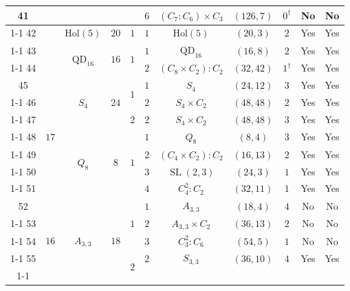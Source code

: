 \documentclass[12pt]{amsart}
\numberwithin{equation}{section}
\theoremstyle{plain}
\theoremstyle{definition}
\theoremstyle{remark}
\DeclareMathOperator{\SL}{SL}
\begin{document}
{\begin{longtable}{|c|c|c|c|c|c|c|c|c|c|c|}
41 &  &  &  &  & $6$ & \multicolumn{1}{c|}{$(C_7:C_6)\times C_3$} & $(126,7)$ & $0^\dagger$ & No & No \\ \cline{1-1} \cline{3-11}
42 &  & $\mathrm{Hol}(5)$ & $20$ & $1$ & $1$ & \multicolumn{1}{c|}{$\mathrm{Hol}(5)$} & $(20,3)$ & $2$ & Yes & Yes \\ \cline{1-1} \cline{3-11}
43 &  & \multirow[t]{2}{*}{$\mathrm{QD}_{16}$} & \multirow[t]{2}{*}{$16$} & \multirow[t]{2}{*}{$1$} & $1$ & \multicolumn{1}{c|}{$\mathrm{QD}_{16}$} & $(16,8)$ & $2$ & Yes & Yes \\ \cline{1-1} \cline{6-11}
44 &  &  &  &  & $2$ & \multicolumn{1}{c|}{$(C_8\times C_2): C_2$} & $(32,42)$ & $1^\dagger$ & Yes & Yes \\ \hline
45 & \multirow[t]{7}{*}{$17$} & \multirow[t]{3}{*}{$S_4$} & \multirow[t]{3}{*}{$24$} & \multirow[t]{2}{*}{$1$} & $1$ & \multicolumn{1}{c|}{$S_4$} & $(24,12)$ & $3$ & Yes & Yes \\ \cline{1-1} \cline{6-11}
46 &  &  &  &  & $2$ & \multicolumn{1}{c|}{$S_4\times C_2$} & $(48,48)$ & $2$ & Yes & Yes \\ \cline{1-1} \cline{5-11}
47 &  &  &  & $2$ & $2$ & \multicolumn{1}{c|}{$S_4\times C_2$} & $(48,48)$ & $3$ & Yes & Yes \\ \cline{1-1} \cline{3-11}
48 &  & \multirow[t]{4}{*}{$Q_8$} & \multirow[t]{4}{*}{$8$} & \multirow[t]{4}{*}{$1$} & $1$ & \multicolumn{1}{c|}{$Q_8$} & $(8,4)$ & $3$ & Yes & Yes \\ \cline{1-1} \cline{6-11}
49 &  &  &  &  & $2$ & \multicolumn{1}{c|}{$(C_4\times C_2):C_2$} & $(16,13)$ & $2$ & Yes & Yes \\ \cline{1-1} \cline{6-11}
50 &  &  &  &  & $3$ & \multicolumn{1}{c|}{$\SL(2,3)$} & $(24,3)$ & $1$ & Yes & Yes \\ \cline{1-1} \cline{6-11}
51 &  &  &  &  & $4$ & \multicolumn{1}{c|}{$C_4^2: C_2$} & $(32,11)$ & $1$ & Yes & Yes \\ \hline
52 & \multirow[t]{21}{*}{$16$} & \multirow[t]{6}{*}{$A_{3,3}$} & \multirow[t]{6}{*}{$18$} & \multirow[t]{3}{*}{$1$} & $1$ & \multicolumn{1}{c|}{$A_{3,3}$} & $(18,4)$ & $4$ & No & No \\ \cline{1-1} \cline{6-11}
53 &  &  &  &  & $2$ & \multicolumn{1}{c|}{$A_{3,3}\times C_2$} & $(36,13)$ & $2$ & No & No \\ \cline{1-1} \cline{6-11}
54 &  &  &  &  & $3$ & \multicolumn{1}{c|}{$C_3^2:C_6$} & $(54,5)$ & $1$ & No & No \\ \cline{1-1} \cline{5-11}
55 &  &  &  & \multirow[t]{3}{*}{$2$} & $2$ & \multicolumn{1}{c|}{$S_{3,3}$} & $(36,10)$ & $4$ & Yes & Yes \\ \cline{1-1} \cline{6-11}

\end{longtable}}
\end{document}
